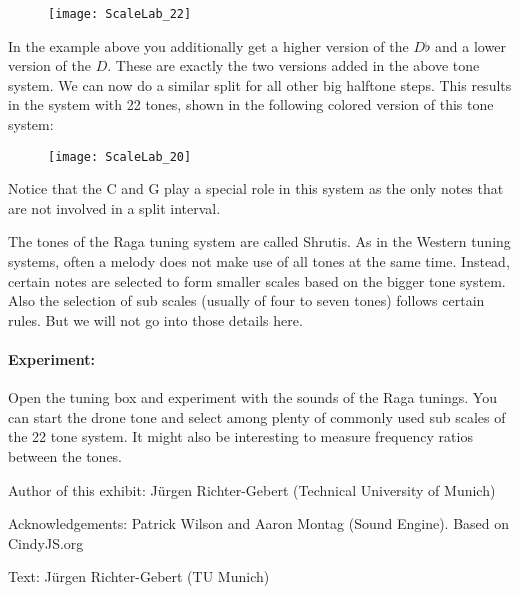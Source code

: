 \begin{figure}[h]
\centering
\texttt{[image: ScaleLab\_22]}
\end{figure}

In the example above you additionally get a higher version of the $D\flat$   and a lower version of the $D$. These are exactly the two versions added in the above tone system. We can now do a similar split for all other big halftone steps. This results in the system with 22 tones, shown in the following colored version of this tone system:

\begin{figure}[h]
\centering
\texttt{[image: ScaleLab\_20]}
\end{figure}

Notice that the C and G play a special role in this system as the only notes that are not involved in a split interval.

The tones of the Raga tuning system are called Shrutis. As in the Western tuning systems, often a melody does not make use of all tones at the same time. Instead, certain notes are selected to form smaller scales based on the bigger tone system. Also the selection of sub scales (usually of four to seven tones) follows certain rules. But we will not go into those details here.

\paragraph{Experiment:} Open the tuning box and experiment with the sounds of the Raga tunings. You can start the drone tone and select among plenty of commonly used sub scales of the 22 tone system. It might also be interesting to measure frequency ratios between the tones.

\begin{sectcredits}

\item[Author of this exhibit:] Jürgen Richter-Gebert (Technical University of Munich)

\item[Acknowledgements:] Patrick Wilson and Aaron Montag (Sound Engine). Based on CindyJS.org

\item[Text:] Jürgen Richter-Gebert (TU Munich)
\end{sectcredits}

